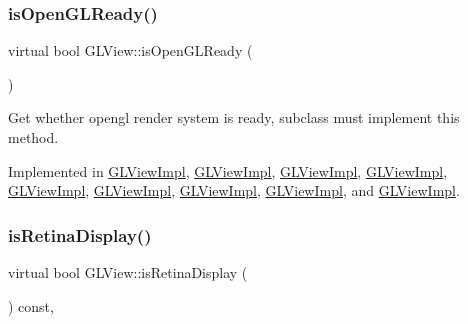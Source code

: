 \mbox{\label{classGLView_a23326d6cbff86205a0d5fa953557838d}} 
\subsubsection{\texorpdfstring{is\+Open\+G\+L\+Ready()}{isOpenGLReady()}\hspace{0.1cm}{\footnotesize\ttfamily [2/2]}}
{\footnotesize\ttfamily virtual bool G\+L\+View\+::is\+Open\+G\+L\+Ready (\begin{DoxyParamCaption}{ }\end{DoxyParamCaption})\hspace{0.3cm}{\ttfamily [pure virtual]}}

Get whether opengl render system is ready, subclass must implement this method. 

Implemented in \hyperlink{classGLViewImpl_a4fdf5280c768291ab6a46731639f8829}{G\+L\+View\+Impl}, \hyperlink{classGLViewImpl_af539e58d1d28db65ba47f107c9c801d7}{G\+L\+View\+Impl}, \hyperlink{classGLViewImpl_af539e58d1d28db65ba47f107c9c801d7}{G\+L\+View\+Impl}, \hyperlink{classGLViewImpl_af539e58d1d28db65ba47f107c9c801d7}{G\+L\+View\+Impl}, \hyperlink{classGLViewImpl_af539e58d1d28db65ba47f107c9c801d7}{G\+L\+View\+Impl}, \hyperlink{classGLViewImpl_a4fdf5280c768291ab6a46731639f8829}{G\+L\+View\+Impl}, \hyperlink{classGLViewImpl_a037047e04b2070c1c6d874756a978a02}{G\+L\+View\+Impl}, \hyperlink{classGLViewImpl_a037047e04b2070c1c6d874756a978a02}{G\+L\+View\+Impl}, and \hyperlink{classGLViewImpl_a037047e04b2070c1c6d874756a978a02}{G\+L\+View\+Impl}.

\mbox{\label{classGLView_a6b51811c80d053326246f2f318010edc}} 
\subsubsection{\texorpdfstring{is\+Retina\+Display()}{isRetinaDisplay()}\hspace{0.1cm}{\footnotesize\ttfamily [1/2]}}
{\footnotesize\ttfamily virtual bool G\+L\+View\+::is\+Retina\+Display (\begin{DoxyParamCaption}{ }\end{DoxyParamCaption}) const\hspace{0.3cm}{\ttfamily [inline]}, {\ttfamily [virtual]}}

